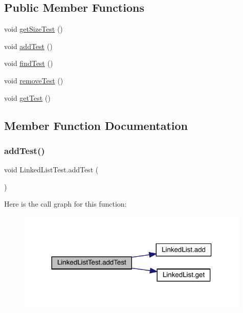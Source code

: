 \subsection*{Public Member Functions}
\begin{DoxyCompactItemize}
\item 
void \mbox{\hyperlink{class_linked_list_test_aa351eea543f28f3246130b6d11495032}{get\+Size\+Test}} ()
\item 
void \mbox{\hyperlink{class_linked_list_test_ace2ec9faf414e71b82c0f90bcd05101c}{add\+Test}} ()
\item 
void \mbox{\hyperlink{class_linked_list_test_a7ec3ac010e6a30800f558fd8ba3963c1}{find\+Test}} ()
\item 
void \mbox{\hyperlink{class_linked_list_test_ad80814e7e3e8452c19b236fb070ee405}{remove\+Test}} ()
\item 
void \mbox{\hyperlink{class_linked_list_test_a8f9041662d2c4a40641ae02627ea3bcd}{get\+Test}} ()
\end{DoxyCompactItemize}


\subsection{Member Function Documentation}
\mbox{\label{class_linked_list_test_ace2ec9faf414e71b82c0f90bcd05101c}} 
\subsubsection{\texorpdfstring{add\+Test()}{addTest()}}
{\footnotesize\ttfamily void Linked\+List\+Test.\+add\+Test (\begin{DoxyParamCaption}{ }\end{DoxyParamCaption})\hspace{0.3cm}{\ttfamily [inline]}}

Here is the call graph for this function\+:
\nopagebreak
\begin{figure}[H]
\begin{center}
\leavevmode
\includegraphics[width=314pt]{class_linked_list_test_ace2ec9faf414e71b82c0f90bcd05101c_cgraph}
\end{center}
\end{figure}
\mbox{\label{class_linked_list_test_a7ec3ac010e6a30800f558fd8ba3963c1}} 
